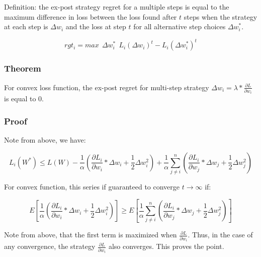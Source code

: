 \documentclass{article}
\begin{document}
Definition: the ex-post strategy regret for a multiple steps is equal to the maximum difference in loss between the loss found after $t$ steps when the strategy at each step is $\Delta w_i$ and the loss at step $t$ for all alternative step choices $\Delta w_i^*$. 

\[ rgt_i =  max \ \ \Delta w_i^* \ \ L_i(\Delta w_i)^t - L_i(\Delta w_i^*)^t \]


\subsubsection{Theorem}

For convex loss function, the ex-post regret for multi-step strategy $\Delta w_i = \lambda * \frac{\partial L}{\partial w_i}$ is equal to 0.

\subsubsection{Proof}

Note from above, we have:

\[ L_i(W^*) \leq L(W) - \frac{1}{\alpha} (\frac{\partial L_i}{\partial w_i} * \Delta w_i + \frac{1}{2} \Delta w_i^2) + \frac{1}{\alpha} \sum_{j \neq i}^{n} (\frac{\partial L_i}{\partial w_j} * \Delta w_j + \frac{1}{2} \Delta w_j^2)  \]

For convex function, this series if guaranteed to converge $ t \rightarrow \infty$ if:

\[ E[\frac{1}{\alpha} (\frac{\partial L_i}{\partial w_i} * \Delta w_i + \frac{1}{2} \Delta w_i^2)] \geq E[\frac{1}{\alpha} \sum_{j \neq i}^{n} (\frac{\partial L_i}{\partial w_j} * \Delta w_j + \frac{1}{2} \Delta w_j^2)] \]

Note from above, that the first term is maximized when $\frac{\partial L}{\partial w_i}$. Thus, in the case of any convergence, the strategy $\frac{\partial L}{\partial w_i}$ also converges.  This proves the point.





\end{document}
